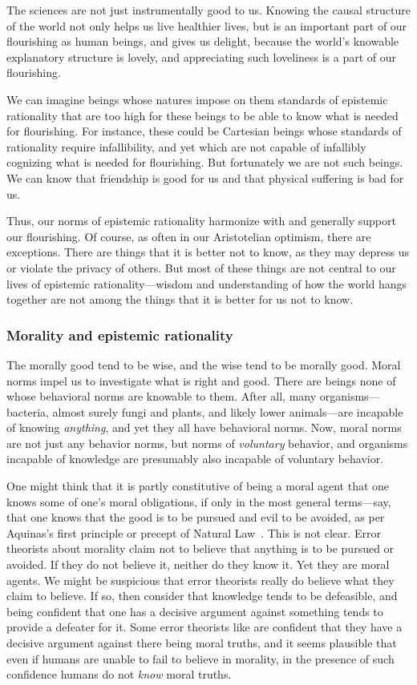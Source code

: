 The sciences are not just instrumentally good to us. Knowing the causal structure of the world not only helps us 
live healthier lives, but is an important part of our flourishing as human beings, and gives us delight, because
the world's knowable explanatory structure is lovely, and appreciating such loveliness is a part of our flourishing.

We can imagine beings whose natures impose on them standards of epistemic rationality that are too high for these beings to 
be able to know what is needed for flourishing. For instance, these could be Cartesian beings whose standards of rationality 
require infallibility, and yet which are not capable of infallibly cognizing what is needed for flourishing. But fortunately 
we are not such beings. We can know that friendship is good for us and that physical suffering is bad for us. 

Thus, our norms of epistemic rationality harmonize with and generally support our flourishing. Of course, as often
in our Aristotelian optimism, there are exceptions. There are things that it is better not to know, as they may
depress us or violate the privacy of others. But most of these things are not central to our lives of epistemic
rationality---wisdom and understanding of how the world hangs together are not among the things that it is better
for us not to know. 

\subsubsection{Morality and epistemic rationality}
The morally good tend to be wise, and the wise tend to be morally good. Moral norms impel us to investigate what is 
right and good. There are beings none of whose behavioral norms are knowable to them. After all, many organisms---bacteria, almost surely fungi and plants, and likely lower animals---are incapable of knowing \textit{anything}, and yet they all have behavioral norms. 
Now, moral norms are not just any behavior norms, but norms of \textit{voluntary} behavior, and organisms incapable
of knowledge are presumably also incapable of voluntary behavior. 

One might think that it is partly constitutive of being a moral agent that one knows some of one's moral obligations, if 
only in the most general terms---say, that one knows that the good is to be pursued and evil to be avoided, as per 
Aquinas's first principle or precept of Natural Law~\parencite[I.94.2]{AquinasST}. This is not clear. Error theorists about morality claim not to believe
that anything is to be pursued or avoided. If they do not believe it, neither do they know it. Yet they are moral agents.
We might be suspicious that error theorists really do believe what they claim to believe. If so, then consider that knowledge
tends to be defeasible, and being confident that one has a decisive argument against something tends to provide a defeater 
for it. Some error theorists like  are confident that they have a decisive argument against there being moral truths, and it 
seems plausible that even if humans are unable to fail to believe in morality, in the presence of such confidence humans do 
not \textit{know} moral truths. 

